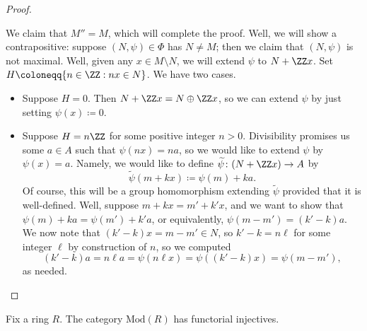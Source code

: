\documentclass[../notes.tex]{subfiles}
\begin{document}
\begin{proof}
\begin{itemize}
		We claim that $M''=M$, which will complete the proof. Well, we will show a contrapositive: suppose $(N,\psi)\in\Phi$ has $N\ne M$; then we claim that $(N,\psi)$ is not maximal. Well, given any $x\in M\setminus N$, we will extend $\psi$ to $N+\ZZ x$. Set $H\coloneqq\{n\in\ZZ:nx\in N\}$. We have two cases.
		\begin{itemize}
			\item Suppose $H=0$. Then $N+\ZZ x=N\oplus\ZZ x$, so we can extend $\psi$ by just setting $\psi(x)\coloneqq0$.
			\item Suppose $H=n\ZZ$ for some positive integer $n>0$. Divisibility promises us some $a\in A$ such that $\psi(nx)=na$, so we would like to extend $\psi$ by $\psi(x)=a$. Namely, we would like to define $\widetilde\psi\colon(N+\ZZ x)\to A$ by
			\[\widetilde\psi(m+kx)\coloneqq\psi(m)+ka.\]
			Of course, this will be a group homomorphism extending $\widetilde\psi$ provided that it is well-defined. Well, suppose $m+kx=m'+k'x$, and we want to show that $\psi(m)+ka=\psi(m')+k'a$, or equivalently, $\psi(m-m')=(k'-k)a$. We now note that $(k'-k)x=m-m'\in N$, so $k'-k=n\ell$ for some integer $\ell$ by construction of $n$, so we computed
			\[(k'-k)a=n\ell a=\psi(n\ell x)=\psi((k'-k)x)=\psi(m-m'),\]
			as needed.
			\qedhere
		\end{itemize}
	\end{itemize}
\end{proof}
\begin{theorem}
	Fix a ring $R$. The category $\mathrm{Mod}(R)$ has functorial injectives.
\end{theorem}
\end{document}

